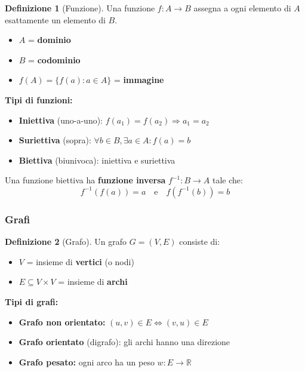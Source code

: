 \documentclass[a4paper, 11pt]{article}
\theoremstyle{definition}
\newtheorem{definizione}{Definizione}[section]
\theoremstyle{remark}
\theoremstyle{remark}
\newenvironment{nota}{%
	\begin{tcolorbox}[
		colback=codebg,
		colframe=primary,
		fonttitle=\bfseries,
		title=Nota,
		left=6pt, right=6pt, top=4pt, bottom=4pt
		]
	}{%
	\end{tcolorbox}
}
\begin{document}
	\begin{definizione}[Funzione]
		Una funzione $f: A \to B$ assegna a ogni elemento di $A$ esattamente un elemento di $B$.
		
		\begin{itemize}
			\item $A$ = \textbf{dominio}
			\item $B$ = \textbf{codominio}
			\item $f(A) = \{f(a) : a \in A\}$ = \textbf{immagine}
		\end{itemize}
	\end{definizione}
	
	\textbf{Tipi di funzioni:}
	\begin{itemize}
		\item \textbf{Iniettiva} (uno-a-uno): $f(a_1) = f(a_2) \Rightarrow a_1 = a_2$
		\item \textbf{Suriettiva} (sopra): $\forall b \in B, \exists a \in A: f(a) = b$
		\item \textbf{Biettiva} (biunivoca): iniettiva e suriettiva
	\end{itemize}
	
	\begin{nota}
		Una funzione biettiva ha \textbf{funzione inversa} $f^{-1}: B \to A$ tale che:
		\[
		f^{-1}(f(a)) = a \quad \text{e} \quad f(f^{-1}(b)) = b
		\]
	\end{nota}
	
	\subsubsection{Grafi}
	
	\begin{definizione}[Grafo]
		Un grafo $G = (V, E)$ consiste di:
		\begin{itemize}
			\item $V$ = insieme di \textbf{vertici} (o nodi)
			\item $E \subseteq V \times V$ = insieme di \textbf{archi}
		\end{itemize}
	\end{definizione}
	
	\textbf{Tipi di grafi:}
	\begin{itemize}
		\item \textbf{Grafo non orientato:} $(u,v) \in E \Leftrightarrow (v,u) \in E$
		\item \textbf{Grafo orientato} (digrafo): gli archi hanno una direzione
		\item \textbf{Grafo pesato:} ogni arco ha un peso $w: E \to \mathbb{R}$
	\end{itemize}
	
\end{document}
